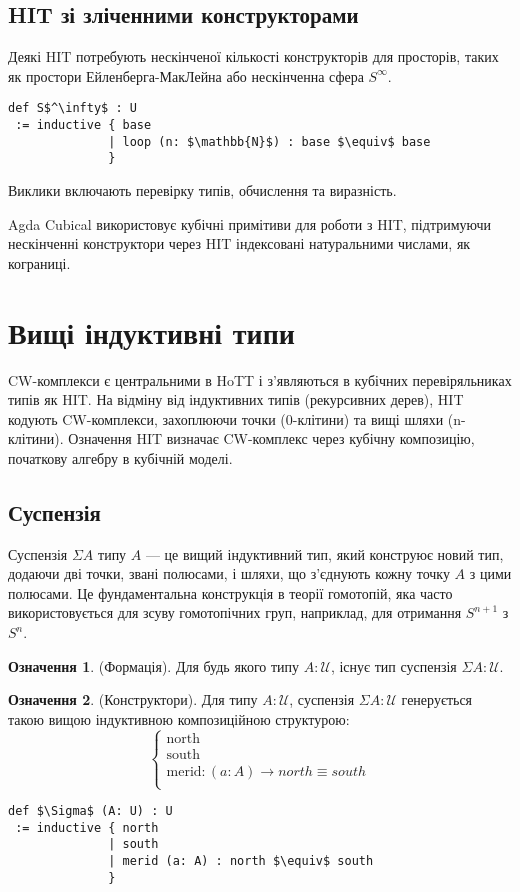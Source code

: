 \documentclass{article}
\theoremstyle{definition}
\newtheorem{definition}{Означення}
\begin{document}
\subsection{HIT зі зліченними конструкторами}
Деякі HIT потребують нескінченої кількості конструкторів для просторів,
таких як простори Ейленберга-МакЛейна або нескінченна сфера \( S^\infty \).
\begin{lstlisting}[mathescape=true]
def S$^\infty$ : U
 := inductive { base
              | loop (n: $\mathbb{N}$) : base $\equiv$ base
              }
\end{lstlisting}
Виклики включають перевірку типів, обчислення та виразність.

Agda Cubical використовує кубічні примітиви для роботи з HIT, підтримуючи
нескінченні конструктори через HIT індексовані натуральними числами, як кограниці.

\section{Вищі індуктивні типи}
CW-комплекси є центральними в HoTT і з’являються в кубічних перевіряльниках типів як HIT.
На відміну від індуктивних типів (рекурсивних дерев), HIT кодують CW-комплекси, захоплюючи
точки (0-клітини) та вищі шляхи (n-клітини). Означення HIT визначає CW-комплекс
через кубічну композицію, початкову алгебру в кубічній моделі.

\newpage
\subsection{Суспензія}
Суспензія \(\Sigma A\) типу \( A \) — це вищий індуктивний тип, який
конструює новий тип, додаючи дві точки, звані полюсами, і шляхи, що з’єднують
кожну точку \( A \) з цими полюсами. Це фундаментальна конструкція в теорії гомотопій,
яка часто використовується для зсуву гомотопічних груп, наприклад, для отримання \( S^{n+1} \) з \( S^n \).

\begin{definition} (Формація).
Для будь якого типу \( A : \mathcal{U} \), існує тип суспензія \( \Sigma A : \mathcal{U} \).
\end{definition}

\begin{definition} (Конструктори).
Для типу \( A : \mathcal{U} \), суспензія \( \Sigma A : \mathcal{U} \)
генерується такою вищою індуктивною композиційною структурою:
\[
\begin{cases}
\text{north} \\
\text{south} \\
\text{merid} : (a : A) \rightarrow north \equiv south \\
\end{cases}
\]
\begin{lstlisting}[mathescape=true]
def $\Sigma$ (A: U) : U
 := inductive { north
              | south
              | merid (a: A) : north $\equiv$ south
              }
\end{lstlisting}
\end{definition}
\end{document}
